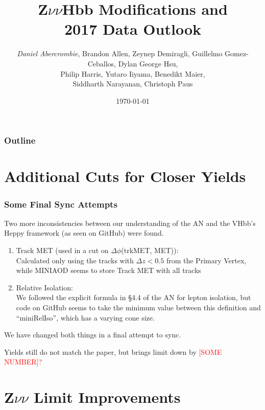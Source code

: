 \documentclass{beamer}
\author[D. Abercrombie]{
  \emph{Daniel Abercrombie}, Brandon Allen, Zeynep Demiragli,
  Guillelmo Gomez-Ceballos, Dylan George Hsu, \\
  Philip Harris, Yutaro Iiyama, Benedikt Maier, \\
  Siddharth Narayanan, Christoph Paus
}
\title{\bf \sffamily Z$\nu\nu$Hbb Modifications and \\ 2017 Data Outlook}
\date{\today}
\begin{document}
\begin{frame}[nonumbering]
  \titlepage
\end{frame}

\begin{frame}
  \frametitle{Outline}
  \tableofcontents
\end{frame}

\section{Additional Cuts for Closer Yields}

\begin{frame}
  \frametitle{Some Final Sync Attempts}

  Two more inconsistencies between our understanding of the AN
  and the VHbb's Heppy framework (as seen on GitHub) were found.

  \begin{enumerate}
  \item Track MET (used in a cut on $\Delta\phi$(trkMET, MET)): \\
    Calculated only using the tracks with $\Delta z < 0.5$ from the Primary Vertex,
    while MINIAOD seems to store Track MET with all tracks
  \item Relative Isolation: \\
    We followed the explicit formula in \S4.4 of the AN for lepton isolation,
    but code on GitHub seems to take the minimum value between this definition
    and ``miniRelIso'', which has a varying cone size.
  \end{enumerate}

  We have changed both things in a final attempt to sync.

  \vspace{12pt}

  Yields still do not match the paper, but brings limit down by \textcolor{red}{[SOME NUMBER]?}

\end{frame}

\section{Z$\nu\nu$ Limit Improvements}
\end{document}
